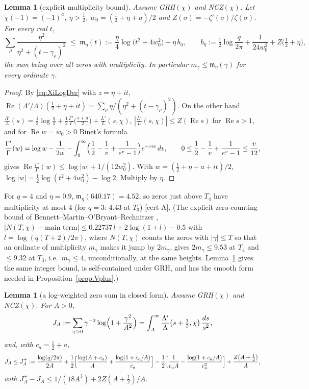 \documentclass[11pt]{amsart}
\newtheorem{lemma}[theorem]{Lemma}
\theoremstyle{definition}
\numberwithin{equation}{section}
\newcommand{\re}{\operatorname{Re}}
\newcommand{\certA}{\textsf{[cert-A]}}
\begin{document}
\begin{lemma}[explicit multiplicity bound]\label{lem:mult}
Assume GRH$(\chi)$ and NCZ$(\chi)$. Let $\chi(-1)=(-1)^a$,
$\eta>\tfrac12$, $w_0=(\tfrac12+\eta+a)/2$ and
$Z(\sigma)=-\zeta'(\sigma)/\zeta(\sigma)$. For every real $t$,
\[
\sum_\rho\frac{\eta^2}{\eta^2+(t-\gamma_\rho)^2}
\;\le\;\mathfrak m_\eta(t):=\frac\eta4\log\bigl(t^2+4w_0^2\bigr)+\eta\,b_\eta,
\qquad
b_\eta:=\tfrac12\log\frac{q}{2\pi}+\frac1{24w_0^2}+Z\bigl(\tfrac12+\eta\bigr),
\]
the sum being over all zeros with multiplicity. In particular
$m_\gamma\le\mathfrak m_\eta(\gamma)$ for every ordinate $\gamma$.
\end{lemma}

\begin{proof}
By \eqref{eq:XiLogDer} with $z=\eta+it$,
$\re(\Lambda'/\Lambda)(\tfrac12+\eta+it)
=\sum_\rho\eta/(\eta^2+(t-\gamma_\rho)^2)$. On the other hand
$\frac{\Lambda'}{\Lambda}(s)=\tfrac12\log\frac q\pi
+\tfrac12\frac{\Gamma'}{\Gamma}\bigl(\frac{s+a}2\bigr)
+\frac{L'}{L}(s,\chi)$, $|\frac{L'}{L}(s,\chi)|\le Z(\re s)$ for
$\re s>1$, and for $\re w=w_0>0$ Binet's formula
\[
\frac{\Gamma'}{\Gamma}(w)=\log w-\frac1{2w}
-\int_0^\infty\Bigl(\frac12-\frac1v+\frac1{e^v-1}\Bigr)e^{-vw}\,dv,
\qquad
0\le\frac12-\frac1v+\frac1{e^v-1}\le\frac v{12},
\]
gives $\re\frac{\Gamma'}{\Gamma}(w)\le\log|w|+1/(12w_0^2)$. With
$w=(\tfrac12+\eta+a+it)/2$,
$\log|w|=\tfrac12\log(t^2+4w_0^2)-\log2$. Multiply by $\eta$.
\end{proof}

For $q=4$ and $\eta=0.9$, $\mathfrak m_\eta(640.17)=4.52$, so zeros
just above $T_4$ have multiplicity at most $4$ (for $q=3$: $4.43$ at
$T_3$) \certA. (The explicit zero-counting bound of
Bennett--Martin--O'Bryant--Rechnitzer \cite{BMOR21},
$|N(T,\chi)-\text{main term}|\le0.22737\,l+2\log(1+l)-0.5$ with
$l=\log(q(T+2)/2\pi)$, where $N(T,\chi)$ counts the zeros with
$|\gamma|\le T$ so that an ordinate of multiplicity $m_\gamma$ makes
it jump by $2m_\gamma$, gives $2m_\gamma\le9.53$ at $T_4$ and
$\le9.32$ at $T_3$, i.e.\ $m_\gamma\le4$, unconditionally, at the
same heights. Lemma~\ref{lem:mult} gives the same integer bound, is
self-contained under GRH, and has the smooth form needed in
Proposition~\ref{prop:Vplus}.)

\begin{lemma}[a log-weighted zero sum in closed form]\label{lem:JA}
Assume GRH$(\chi)$ and NCZ$(\chi)$. For $A>0$,
\[
J_A:=\sum_{\gamma>0}\gamma^{-2}\log\Bigl(1+\frac{\gamma^2}{A^2}\Bigr)
=\int_A^\infty\frac{\Lambda'}{\Lambda}\bigl(s+\tfrac12,\chi\bigr)\,
\frac{ds}{s^2},
\]
and, with $c_a=\tfrac12+a$,
\[
J_A\le J_A^+:=\frac{\log(q/2\pi)}{2A}
+\frac12\Bigl[\frac{\log(A+c_a)}{A}+\frac{\log(1+c_a/A)}{c_a}\Bigr]
-\frac12\Bigl[\frac1{c_aA}-\frac{\log(1+c_a/A)}{c_a^2}\Bigr]
+\frac{Z(A+\tfrac12)}{A},
\]
with $J_A^+-J_A\le1/(18A^3)+2Z(A+\tfrac12)/A$.
\end{lemma}
\end{document}
